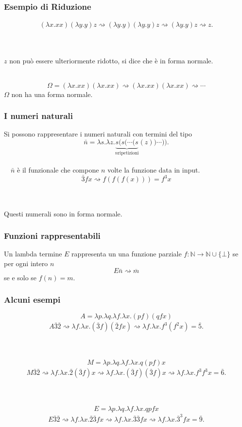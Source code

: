 \documentclass{beamer}
\renewcommand{\l}{\lambda}
\newcommand{\conv}{\rightsquigarrow}
\begin{document}
\begin{frame}
    \frametitle{Esempio di Riduzione}
    \begin{align*}
        (\l x.xx)(\l y.y)z \conv (\l y.y)(\l y.y)z 
        \conv (\l y.y)z \conv z.
    \end{align*}
    \\~\

    $z$ non pu\`o essere ulteriormente ridotto, si dice che \`e in forma
    normale.
    \\~\

    \[
        \Omega = (\l x.xx)(\l x.xx) \conv (\l x.xx)(\l x.xx) \conv\cdots
    \]
    $\Omega$ non ha una forma normale.
\end{frame}

\begin{frame}
    \frametitle{I numeri naturali}

    Si possono rappresentare i numeri naturali con termini del tipo
    \[
        \bar{n} = \l s. \l z. \underbrace{s ( s ( \cdots (s}_{n\text{
            ripetizioni}} (z))\cdots )).
    \]
    \\~\
    $\bar{n}$ \`e il funzionale che compone $n$ volte la funzione data in input.
    \[
        \bar{3} f x \conv f(f(f(x))) = f^3x
    \]
    \\~\

    Questi numerali sono in forma normale.
\end{frame}

\begin{frame}
    \frametitle{Funzioni rappresentabili}

    Un lambda termine $E$ rappresenta un una funzione parziale ${f\colon
    \mathbb{N}\rightarrow \mathbb{N}\cup \{\bot\} }$ se per ogni intero $n$
    \[
        E\bar{n}\conv \overline{m}
    \]
    se e solo se $f(n)=m$.
\end{frame}

\begin{frame}
    \frametitle{Alcuni esempi} 

    \[
        A = \l p. \l q. \l f. \l x. (pf)(qfx)
    \]
    \begin{align*}
        A \bar{3} \bar{2} \conv \l f. \l x. (\bar{3}f)(\bar{2}fx)
        \conv \l f. \l x. f^3(f^2x) = \bar{5}.
    \end{align*}
    \\~\

    \[
        M = \l p. \l q. \l f. \l x. q(pf)x
    \]
    \begin{align*}
        M \bar{3} \bar{2} \conv \l f. \l x. \bar{2} (\bar{3}f)x
        \conv \l f. \l x. (\bar{3}f)(\bar{3}f)x \conv \l f. \l x.f^3f^3x =
        \bar{6}.
    \end{align*}
    \\~\

    \[
        E = \l p. \l q. \l f. \l x. qpfx
    \]
    \begin{align*}
        E \bar{3} \bar{2} \conv \l f. \l x. \bar{2} \bar{3}fx
        \conv \l f. \l x. \bar{3}\bar{3}fx \conv \l f. \l x. \bar{3}^3 fx =
        \bar{9}.
    \end{align*}
\end{frame}
\end{document}
